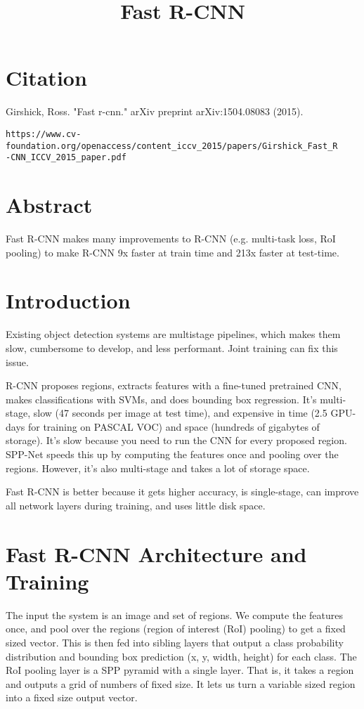 \documentclass[a4paper]{article}
\title{Fast R-CNN}
\date{}
\begin{document}
\maketitle

\section{Citation}
Girshick, Ross. "Fast r-cnn." arXiv preprint arXiv:1504.08083 (2015).

\begin{verbatim}
https://www.cv-foundation.org/openaccess/content_iccv_2015/papers/Girshick_Fast_R
-CNN_ICCV_2015_paper.pdf
\end{verbatim}

\section{Abstract}
Fast R-CNN makes many improvements to R-CNN (e.g. multi-task loss, RoI pooling)
to make R-CNN 9x faster at train time and 213x faster at test-time.

\section{Introduction}
Existing object detection systems are multistage pipelines, which makes them
slow, cumbersome to develop, and less performant. Joint training can fix this
issue.

R-CNN proposes regions, extracts features with a fine-tuned pretrained CNN,
makes classifications with SVMs, and does bounding box regression. It's
multi-stage, slow (47 seconds per image at test time), and expensive in time
(2.5 GPU-days for training on PASCAL VOC) and space (hundreds of gigabytes of
storage). It's slow because you need to run the CNN for every proposed region.
SPP-Net speeds this up by computing the features once and pooling over the
regions. However, it's also multi-stage and takes a lot of storage space.

Fast R-CNN is better because it gets higher accuracy, is single-stage, can
improve all network layers during training, and uses little disk space.

\section{Fast R-CNN Architecture and Training}
The input the system is an image and set of regions. We compute the features
once, and pool over the regions (region of interest (RoI) pooling) to get a
fixed sized vector. This is then fed into sibling layers that output a class
probability distribution and bounding box prediction (x, y, width, height)
for each class. The RoI pooling layer is a SPP pyramid with a single layer. That
is, it takes a region and outputs a grid of numbers of fixed size. It lets
us turn a variable sized region into a fixed size output vector.
\end{document}
